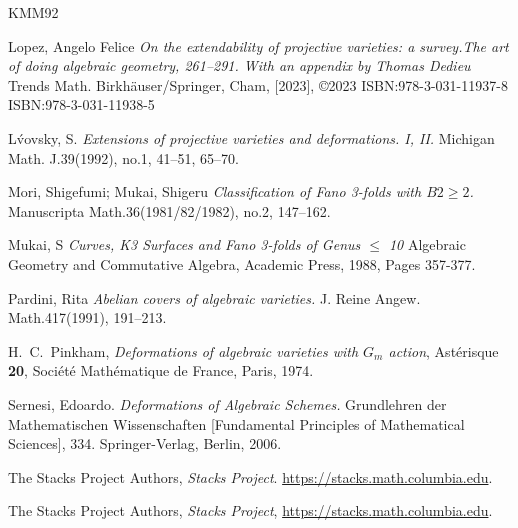 \documentclass[11pt,twoside]{amsart}
\theoremstyle{plain}
\numberwithin{equation}{section}
\theoremstyle{definition}
\begin{document}
\begin{thebibliography}{KMM92}
\color{black}



Lopez, Angelo Felice
\emph{On the extendability of projective varieties: a survey.The art of doing algebraic geometry, 261–291. With an appendix by Thomas Dedieu}
Trends Math. Birkhäuser/Springer, Cham, [2023], ©2023 ISBN:978-3-031-11937-8
ISBN:978-3-031-11938-5



L\'vovsky, S.
\emph{Extensions of projective varieties and deformations. I, II.}
Michigan Math. J.39(1992), no.1, 41–51, 65--70.





Mori, Shigefumi; Mukai, Shigeru
\emph{Classification of Fano 3-folds with $B2 \geq 2$.}
Manuscripta Math.36(1981/82/1982), no.2, 147–162.


Mukai, S
\emph{Curves, K3 Surfaces and Fano 3-folds of Genus $\leq$ 10}
Algebraic Geometry and Commutative Algebra, Academic Press,
1988, Pages 357-377.

  \color{black}
  


  \color{black}

Pardini, Rita
\emph{Abelian covers of algebraic varieties.}
J. Reine Angew. Math.417(1991), 191–213.





H.~C.~Pinkham,
\newblock \emph{Deformations of algebraic varieties with \(G_m\) action},
\newblock Ast\'erisque \textbf{20}, Soci\'et\'e Math\'ematique de France, Paris, 1974.


Sernesi, Edoardo.
\emph{Deformations of Algebraic Schemes.}
Grundlehren der Mathematischen Wissenschaften [Fundamental Principles of Mathematical Sciences], 334. Springer-Verlag, Berlin, 2006.

The Stacks Project Authors,
\emph{Stacks Project}.
\url{https://stacks.math.columbia.edu}.

The Stacks Project Authors,
\emph{Stacks Project},
\url{https://stacks.math.columbia.edu}.


\end{thebibliography}
\end{document}
